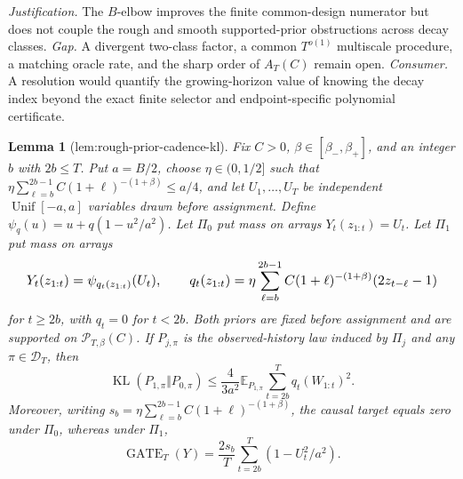 \documentclass{article}
\newtheorem{lemma}{Lemma}
\begin{document}
\par\smallskip\noindent \textit{Justification.} The \(B\)-elbow improves the finite common-design numerator but does not couple the rough and smooth supported-prior obstructions across decay classes. \textit{Gap.} A divergent two-class factor, a common \(T^{o(1)}\) multiscale procedure, a matching oracle rate, and the sharp order of \(A_T(C)\) remain open. \textit{Consumer.} A resolution would quantify the growing-horizon value of knowing the decay index beyond the exact finite selector and endpoint-specific polynomial certificate.

\begin{lemma}[lem:rough-prior-cadence-kl]\label{lem:rough-prior-cadence-kl}
Fix \(C>0\), \(\beta\in[\beta_-,\beta_+]\), and an integer \(b\) with \(2b\le T\). Put \(a=B/2\), choose \(\eta\in(0,1/2]\) such that \(\eta\sum_{\ell=b}^{2b-1}C(1+\ell)^{-(1+\beta)}\le a/4\), and let \(U_1,\ldots,U_T\) be independent \(\operatorname{Unif}[-a,a]\) variables drawn before assignment. Define \(\psi_q(u)=u+q(1-u^2/a^2)\). Let \(\Pi_0\) put mass on arrays \(Y_t(z_{1:t})=U_t\). Let \(\Pi_1\) put mass on arrays \[
\makebox[\linewidth][c]{\resizebox{0.98\linewidth}{!}{\leavevmode\par\noindent \makebox[\linewidth][c]{\resizebox{0.98\linewidth}{!}{\(\displaystyle \displaystyle Y_t(z_{1:t})=\psi_{q_t(z_{1:t})}(U_t),\qquad q_t(z_{1:t})=\eta\sum_{\ell=b}^{2b-1}C(1+\ell)^{-(1+\beta)}(2z_{t-\ell}-1)\)}}\par\noindent}}
\] for \(t\ge2b\), with \(q_t=0\) for \(t<2b\). Both priors are fixed before assignment and are supported on \(\mathcal P_{T,\beta}(C)\). If \(P_{j,\pi}\) is the observed-history law induced by \(\Pi_j\) and any \(\pi\in\mathcal D_T\), then \[\operatorname{KL}(P_{1,\pi}\Vert P_{0,\pi})\le\frac{4}{3a^2}\mathbb E_{P_{1,\pi}}\sum_{t=2b}^Tq_t(W_{1:t})^2.\] Moreover, writing \(s_b=\eta\sum_{\ell=b}^{2b-1}C(1+\ell)^{-(1+\beta)}\), the causal target equals zero under \(\Pi_0\), whereas under \(\Pi_1\), \[\operatorname{GATE}_T(Y)=\frac{2s_b}{T}\sum_{t=2b}^T(1-U_t^2/a^2).\]
\end{lemma}
\end{document}
